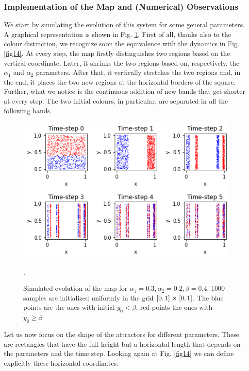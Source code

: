 \documentclass[11pt,titlepage]{article}
\begin{document}
\subsubsection{Implementation of the Map and (Numerical) Observations} \label{implementation_of_the_map_and}
We start by simulating the evolution of this system for some general parameters. A graphical representation is shown in Fig. \ref{fig15}. First of all, thanks also to the colour distinction, we recognize soon the equivalence with the dynamics in Fig. \ref{fig14}. At every step, the map firstly distinguishes two regions based on the vertical coordinate. Later, it shrinks the two regions based on, respectively, the $\alpha_1$ and $\alpha_2$ parameters. After that, it vertically stretches the two regions and, in the end, it places the two new regions at the horizontal borders of the square. Further, what we notice is the continuous addition of new bands that get shorter at every step. The two initial colours, in particular, are separated in all the following bands.
\begin{center}
	\begin{figure} [h]
		\centering
		\includegraphics[width = 5in]{./figures/ex3_1.png}
		\caption{Simulated evolution of the map for $\alpha_1=0.3, \alpha_2=0.2, \beta=0.4$. 1000 samples are initialized uniformly in the grid $[0,1]\cross [0,1]$. The blue points are the ones with initial $y_0<\beta$, red points the ones with $y_0\ge\beta$}.
		\label{fig15}
	\end{figure}
\end{center}
Let us now focus on the shape of the attractors for different parameters. These are rectangles that have the full height but a horizontal length that depends on the parameters and the time step. Looking again at Fig. \ref{fig14} we can define explicitly these horizontal coordinates:
\end{document}
